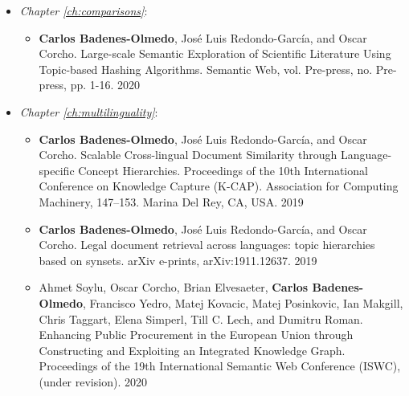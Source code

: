 \begin{itemize}
\begin{itemize}
\end{itemize}
\item \textit{Chapter \ref{ch:comparisons}}:
\begin{itemize}
\item \textbf{Carlos Badenes-Olmedo}, José Luis Redondo-García, and Oscar Corcho. Large-scale Semantic Exploration of Scientific Literature Using Topic-based Hashing Algorithms. Semantic Web, vol. Pre-press, no. Pre-press, pp. 1-16. 2020
\end{itemize}
\item \textit{Chapter \ref{ch:multilinguality}}:
\begin{itemize}
\item \textbf{Carlos Badenes-Olmedo}, José Luis Redondo-García, and Oscar Corcho. Scalable Cross-lingual Document Similarity through Language-specific Concept Hierarchies. Proceedings of the 10th International Conference on Knowledge Capture (K-CAP). Association for Computing Machinery, 147–153. Marina Del Rey, CA, USA. 2019
\item \textbf{Carlos Badenes-Olmedo}, José Luis Redondo-García, and Oscar Corcho. Legal document retrieval across languages: topic hierarchies based on synsets. arXiv e-prints, arXiv:1911.12637. 2019
\item Ahmet Soylu, Oscar Corcho, Brian Elvesaeter, \textbf{Carlos Badenes-Olmedo}, Francisco Yedro, Matej Kovacic, Matej Posinkovic, Ian Makgill, Chris Taggart, Elena Simperl, Till C. Lech, and Dumitru Roman. Enhancing Public Procurement in the European Union through Constructing and Exploiting an Integrated Knowledge Graph. Proceedings of the 19th International Semantic Web Conference (ISWC), (under revision). 2020
\end{itemize}
\end{itemize}


